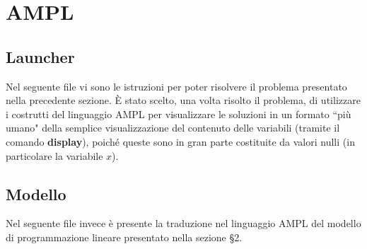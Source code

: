 \documentclass[main.tex]{subfiles}
\begin{document}
\section{AMPL}

\subsection{Launcher}
Nel seguente file vi sono le istruzioni per poter risolvere il problema presentato nella precedente sezione.
È stato scelto, una volta risolto il problema, di utilizzare i costrutti del linguaggio AMPL per visualizzare
le soluzioni in un formato ``più umano" della semplice visualizzazione del contenuto delle variabili
(tramite il comando \textbf{display}), poiché queste sono in gran parte costituite da valori nulli (in particolare la variabile $x$).


\subsection{Modello}
Nel seguente file invece è presente la traduzione nel linguaggio AMPL del modello di programmazione lineare presentato nella sezione §2.

\end{document}
